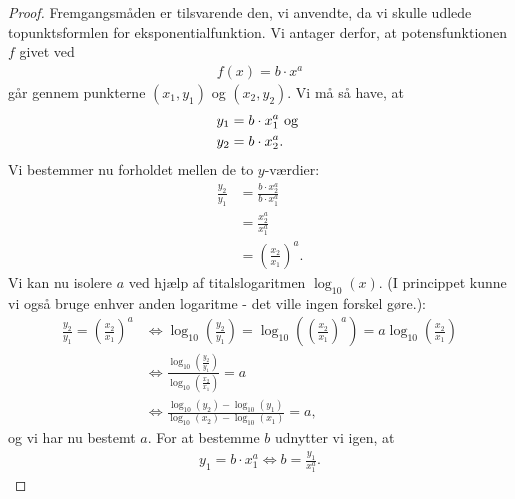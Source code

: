 \begin{proof}
Fremgangsmåden er tilsvarende den, vi anvendte, da vi skulle udlede topunktsformlen for eksponentialfunktion. Vi antager derfor, at potensfunktionen $f$ givet ved
\begin{align*}
f(x) = b\cdot x^a
\end{align*}
går gennem punkterne $(x_1,y_1)$ og $(x_2,y_2)$. Vi må så have, at 
\begin{align*}
y_1 &= b\cdot x_1^a \textnormal{ og }\\ y_2 &= b\cdot x_2^a.
\end{align*}
Vi bestemmer nu forholdet mellen de to $y$-værdier:
\begin{align*}
\frac{y_2}{y_1} &= \frac{b\cdot x_2^a}{b\cdot x_1^a}\\
&= \frac{x_2^a}{x_1^a}\\
&= \left(\frac{x_2}{x_1}\right)^a.
\end{align*}
Vi kan nu isolere $a$ ved hjælp af titalslogaritmen $\log_{10}(x)$. (I princippet kunne vi også bruge enhver anden logaritme - det ville ingen forskel gøre.):
\begin{align*}
\frac{y_2}{y_1} = \left(\frac{x_2}{x_1}\right)^a &\Leftrightarrow \log_{10}\left(\frac{y_2}{y_1}\right) = \log_{10}\left(\left(\frac{x_2}{x_1}\right)^a\right) = a\log_{10}\left(\frac{x_2}{x_1}\right)\\
&\Leftrightarrow \frac{\log_{10}\left(\frac{y_2}{y_1}\right)}{\log_{10}\left(\frac{x_2}{x_1}\right)} = a\\
&\Leftrightarrow \frac{\log_{10}(y_2)-\log_{10}(y_1)}{\log_{10}(x_2)-\log_{10}(x_1)} = a,
\end{align*}
og vi har nu bestemt $a$. 
For at bestemme $b$ udnytter vi igen, at 
\begin{align*}
y_1 = b\cdot x_1^a \Leftrightarrow b = \frac{y_1}{x_1^a}.
\end{align*} 
\end{proof}
